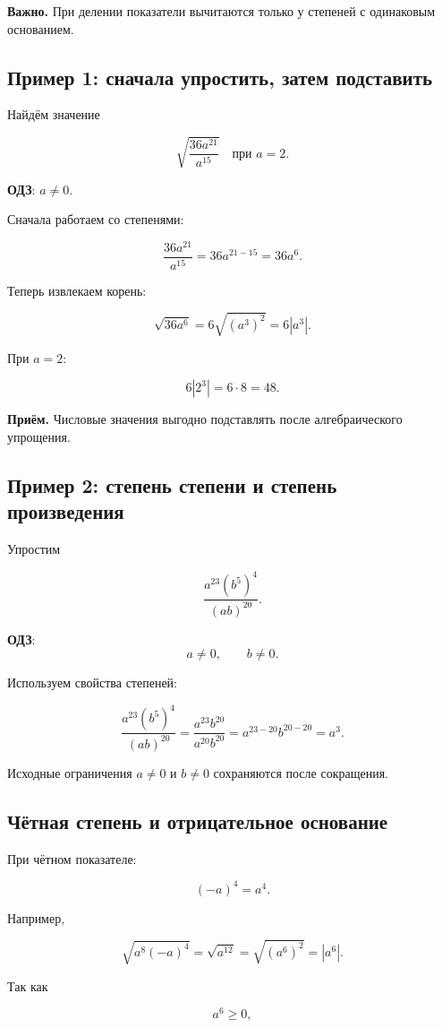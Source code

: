\documentclass[a4paper,12pt]{article}
\newcommand{\ODZ}{\textbf{ОДЗ}}
\begin{document}
\textbf{Важно.}
При делении показатели вычитаются только у степеней
с одинаковым основанием.

\subsection{Пример 1: сначала упростить, затем подставить}

Найдём значение

\[
\sqrt{\frac{36a^{21}}{a^{15}}}
\quad\text{при }a=2.
\]

\ODZ: $a\ne0$.

Сначала работаем со степенями:

\[
\frac{36a^{21}}{a^{15}}
=
36a^{21-15}
=
36a^6.
\]

Теперь извлекаем корень:

\[
\sqrt{36a^6}
=
6\sqrt{(a^3)^2}
=
6|a^3|.
\]

При $a=2$:

\[
6|2^3|
=
6\cdot8
=
48.
\]

\textbf{Приём.}
Числовые значения выгодно подставлять после
алгебраического упрощения.

\subsection{Пример 2: степень степени и степень произведения}

Упростим

\[
\frac{a^{23}(b^5)^4}{(ab)^{20}}.
\]

\ODZ:
\[
a\ne0,
\qquad
b\ne0.
\]

Используем свойства степеней:

\[
\frac{a^{23}(b^5)^4}{(ab)^{20}}
=
\frac{a^{23}b^{20}}{a^{20}b^{20}}
=
a^{23-20}b^{20-20}
=
a^3.
\]

Исходные ограничения $a\ne0$ и $b\ne0$
сохраняются после сокращения.

\subsection{Чётная степень и отрицательное основание}

При чётном показателе:

\[
(-a)^4=a^4.
\]

Например,

\[
\sqrt{a^8(-a)^4}
=
\sqrt{a^{12}}
=
\sqrt{(a^6)^2}
=
|a^6|.
\]

Так как

\[
a^6\ge0,
\]
\end{document}
